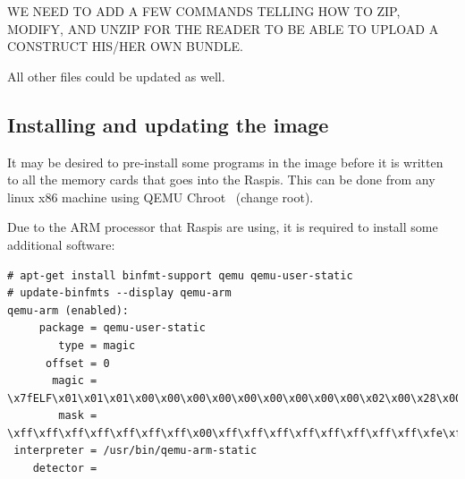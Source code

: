 %

WE NEED TO ADD A FEW COMMANDS TELLING HOW TO ZIP, MODIFY, AND UNZIP
FOR THE READER TO BE ABLE TO UPLOAD A CONSTRUCT HIS/HER OWN BUNDLE.

All other files could be updated as well.

\subsection{Installing and updating the image}

It may be desired to pre-install some programs in the image before it is
written to all the memory cards that goes into the \ac{Raspi}s.
This can be done from any linux x86 machine using QEMU Chroot~\cite{QemuUserEmulation}
(change root).

Due to the \ac{ARM} processor that \ac{Raspi}s are using, it is required to
install some additional software:

\begin{lstlisting}[]
# apt-get install binfmt-support qemu qemu-user-static
# update-binfmts --display qemu-arm
qemu-arm (enabled):
     package = qemu-user-static
        type = magic
      offset = 0
       magic = \x7fELF\x01\x01\x01\x00\x00\x00\x00\x00\x00\x00\x00\x00\x02\x00\x28\x00
        mask = \xff\xff\xff\xff\xff\xff\xff\x00\xff\xff\xff\xff\xff\xff\xff\xff\xfe\xff\xff\xff
 interpreter = /usr/bin/qemu-arm-static
    detector = 
\end{lstlisting}
\FloatBarrier
\vspace{-5mm}

